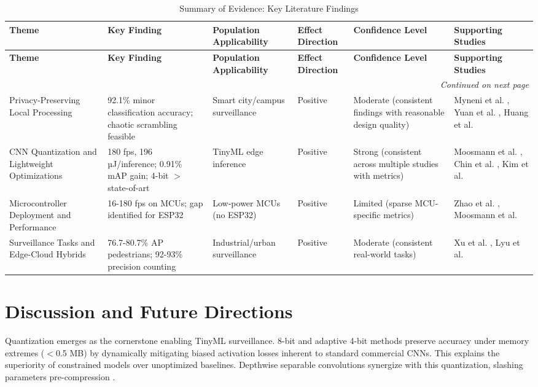 \documentclass[12pt, a4paper]{article}
\begin{document}
\begin{landscape}
\footnotesize
\begin{longtable}{ p{3.5cm} p{4.5cm} p{3.5cm} p{2cm} p{3.5cm} p{4cm} }
\caption{Summary of Evidence: Key Literature Findings} \label{tab:summary} \\
\toprule
\textbf{Theme} & \textbf{Key Finding} & \textbf{Population Applicability} & \textbf{Effect Direction} & \textbf{Confidence Level} & \textbf{Supporting Studies} \\
\midrule
\endfirsthead
\toprule
\textbf{Theme} & \textbf{Key Finding} & \textbf{Population Applicability} & \textbf{Effect Direction} & \textbf{Confidence Level} & \textbf{Supporting Studies} \\
\midrule
\endhead
\midrule
\multicolumn{6}{r}{\textit{Continued on next page}} \\
\endfoot
\bottomrule
\endlastfoot

Privacy-Preserving Local Processing & 92.1\% minor classification accuracy; chaotic scrambling feasible & Smart city/campus surveillance & Positive & Moderate (consistent findings with reasonable design quality) & Myneni et al. \cite{myneni2022}, Yuan et al. \cite{yuan2020}, Huang et al. \cite{huang2023} \\

CNN Quantization and Lightweight Optimizations & 180 fps, 196 µJ/inference; 0.91\% mAP gain; 4-bit $>$ state-of-art & TinyML edge inference & Positive & Strong (consistent across multiple studies with metrics) & Moosmann et al. \cite{moosmann2023}, Chin et al. \cite{chin2022}, Kim et al. \cite{kim2020} \\

Microcontroller Deployment and Performance & 16-180 fps on MCUs; gap identified for ESP32 & Low-power MCUs (no ESP32) & Positive & Limited (sparse MCU-specific metrics) & Zhao et al. \cite{zhao2020}, Moosmann et al. \cite{moosmann2023} \\

Surveillance Tasks and Edge-Cloud Hybrids & 76.7-80.7\% AP pedestrians; 92-93\% precision counting & Industrial/urban surveillance & Positive & Moderate (consistent real-world tasks) & Xu et al. \cite{xu2021}, Lyu et al. \cite{lyu2022} \\

\end{longtable}
\end{landscape}

\normalsize

\section{Discussion and Future Directions}
Quantization emerges as the cornerstone enabling TinyML surveillance. 8-bit \cite{moosmann2023} and adaptive 4-bit methods \cite{chin2022} preserve accuracy under memory extremes ($<$0.5 MB) by dynamically mitigating biased activation losses inherent to standard commercial CNNs. This explains the superiority of constrained models over unoptimized baselines. Depthwise separable convolutions synergize with this quantization, slashing parameters pre-compression \cite{zhao2020, xu2021}. 
\end{document}
